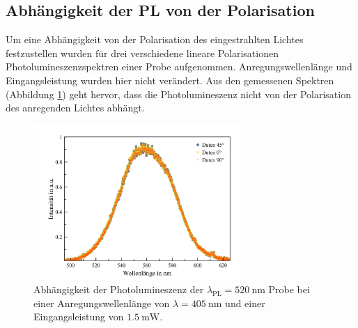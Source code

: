 \subsection{Abhängigkeit der PL von der Polarisation}
\label{sec:Polarisation}
Um eine Abhängigkeit von der Polarisation des eingestrahlten Lichtes festzustellen wurden für drei verschiedene lineare Polarisationen Photolumineszenzspektren einer Probe aufgenommen. Anregungswellenlänge und  Eingangsleistung wurden hier nicht verändert. Aus den gemessenen Spektren (Abbildung \ref{fig:Polarisation}) geht hervor, dass die Photolumineszenz nicht von der Polarisation des anregenden Lichtes abhängt.
\begin{figure}[H]
  \centering
  \includegraphics[width=0.7\textwidth]{plots/Poldepplot.png}
  \caption{Abhängigkeit der Photolumineszenz der $\lambda_{\text{PL}}=\SI{520}{\nano\meter}$
   Probe bei einer Anregungswellenlänge von $\lambda=\SI{405}{\nano\meter}$ und einer Eingangsleistung von $\SI{1,5}{\milli\watt}$.}
   \label{fig:Polarisation}
\end{figure}

